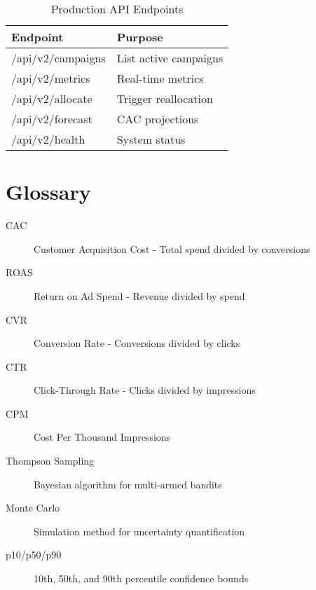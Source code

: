 \documentclass[11pt,a4paper]{report}
\begin{document}
\begin{table}[H]
\centering
\begin{tabular}{|l|l|}
\hline
\rowcolor{aelpblue!20}
\textbf{Endpoint} & \textbf{Purpose} \\
\hline
/api/v2/campaigns & List active campaigns \\
/api/v2/metrics & Real-time metrics \\
/api/v2/allocate & Trigger reallocation \\
/api/v2/forecast & CAC projections \\
/api/v2/health & System status \\
\hline
\end{tabular}
\caption{Production API Endpoints}
\end{table}

\clearpage

\section{Glossary}

\begin{description}
\item[CAC] Customer Acquisition Cost - Total spend divided by conversions
\item[ROAS] Return on Ad Spend - Revenue divided by spend
\item[CVR] Conversion Rate - Conversions divided by clicks
\item[CTR] Click-Through Rate - Clicks divided by impressions
\item[CPM] Cost Per Thousand Impressions
\item[Thompson Sampling] Bayesian algorithm for multi-armed bandits
\item[Monte Carlo] Simulation method for uncertainty quantification
\item[p10/p50/p90] 10th, 50th, and 90th percentile confidence bounds
\end{description}
\end{document}

